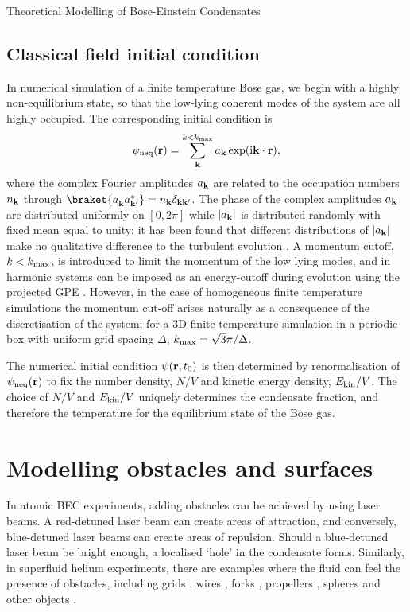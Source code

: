 \begin{chapter}{\label{cha:theoretical_model}Theoretical Modelling of Bose-Einstein Condensates}
\subsection{\label{section:cfieldinitcond} Classical field initial condition}
	In numerical simulation of a finite temperature Bose gas, we begin with a highly non-equilibrium state, so that the low-lying coherent modes of the system are all highly occupied. The corresponding initial condition is
	\begin{equation}
	\psi_{\rm neq}({\bf r}) = \sum \limits_{\bf k}^{k<k_{\rm max}} a_{\bf k} \exp (\mathrm{i}{\bf k}\cdot{\bf r}),
	\label{eq:cFieldIC}
	\end{equation}
	where the complex Fourier amplitudes $a_{\bf k}$ are related to the occupation numbers $n_{\bf k}$ through $\braket{a_{\bf k}^{\,}a_{\bf k'}^*} = n_{\bf k}\delta_{\bf kk'}$. The phase of the complex amplitudes $a_{\bf k}$ are distributed uniformly on $[0,2\pi]$ while $|a_{\bf k}|$ is distributed randomly with fixed mean equal to unity; it has been found that different distributions of $|a_{\bf k}|$ make no qualitative difference to the turbulent evolution \cite{PhysRevA.66.013603}. A momentum cutoff, $k<k_{\rm max}$, is introduced to limit the momentum of the low lying modes, and in harmonic systems can be imposed as an energy-cutoff during evolution using the projected GPE \cite{PhysRevLett.87.160402}. However, in the case of homogeneous finite temperature simulations the momentum cut-off arises naturally as a consequence of the discretisation of the system; for a 3D finite temperature simulation in a periodic box with uniform grid spacing $\Delta$, $k_{\rm max}=\sqrt{3} \pi / \Delta$.

	The numerical initial condition $\psi({\bf r},t_0)$ is then determined by renormalisation of $\psi_{\rm neq}({\bf r})$ to fix the number density, $N/V$ and kinetic energy density, $E_{\rm kin}/V$. The choice of $N/V$ and $E_{\rm kin}/V$ uniquely determines the condensate fraction, and therefore the temperature for the equilibrium state of the Bose gas.

\section{\label{section:potentials}Modelling obstacles and surfaces}
In atomic BEC experiments, adding obstacles can be achieved by using laser beams. A red-detuned laser beam can create areas of attraction, and conversely, blue-detuned laser beams can create areas of repulsion. Should a blue-detuned laser beam be bright enough, a localised `hole' in the condensate forms. Similarly, in superfluid helium experiments, there are examples where the fluid can feel the presence of obstacles, including grids \cite{Davis2000}, wires \cite{Guenault1986,Bradley2005,Bradley2011,Fisher2001}, forks \cite{Blaauwgeers2007,Bradley2012}, propellers \cite{Tabeling,Salort}, spheres \cite{Schoepe1995} and other objects \cite{VinenSkrbek2008}.


\end{chapter}
